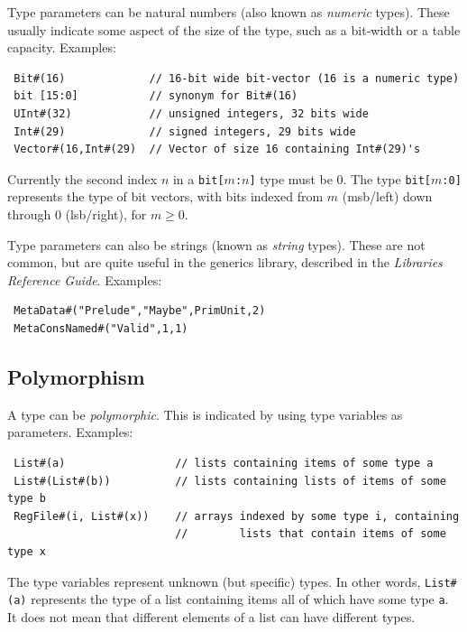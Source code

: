 \documentclass[twoside,letterpaper]{article}
\newcommand{\LibRefGuide}{\emph{Libraries Reference Guide}}
\begin{document}
Type parameters can be natural numbers (also known as \emph{numeric} types).  These
usually indicate some aspect of the size of the type, such as a
bit-width or a table capacity.
Examples:
\begin{verbatim}
 Bit#(16)             // 16-bit wide bit-vector (16 is a numeric type)
 bit [15:0]           // synonym for Bit#(16)
 UInt#(32)            // unsigned integers, 32 bits wide
 Int#(29)             // signed integers, 29 bits wide
 Vector#(16,Int#(29)  // Vector of size 16 containing Int#(29)'s
\end{verbatim}
Currently the second index $n$ in a \texttt{bit[$m$:$n$]} type must be 0.
The type \texttt{bit[$m$:0]} represents the type of bit vectors, with
bits indexed from $m$ (msb/left) down through 0 (lsb/right), for $m
\ge 0$.

Type parameters can also be strings (known as \emph{string} types).
These are not common, but are quite useful in the generics library,
described in the \LibRefGuide.
Examples:
\begin{verbatim}
 MetaData#("Prelude","Maybe",PrimUnit,2)
 MetaConsNamed#("Valid",1,1)
\end{verbatim}


\subsection{Polymorphism}

\label{sec-polymorphism-brief}

A type can be {\emph{polymorphic}}.
This is indicated by using type variables as parameters.
Examples:
\begin{verbatim}
 List#(a)                 // lists containing items of some type a
 List#(List#(b))          // lists containing lists of items of some type b
 RegFile#(i, List#(x))    // arrays indexed by some type i, containing
                          //        lists that contain items of some type x
\end{verbatim}
The type variables represent unknown (but specific) types.  In other
words, \texttt{List\#(a)} represents the type of a list containing items
all of which have some type \texttt{a}.  It does not mean that different
elements of a list can have different types.

\end{document}
